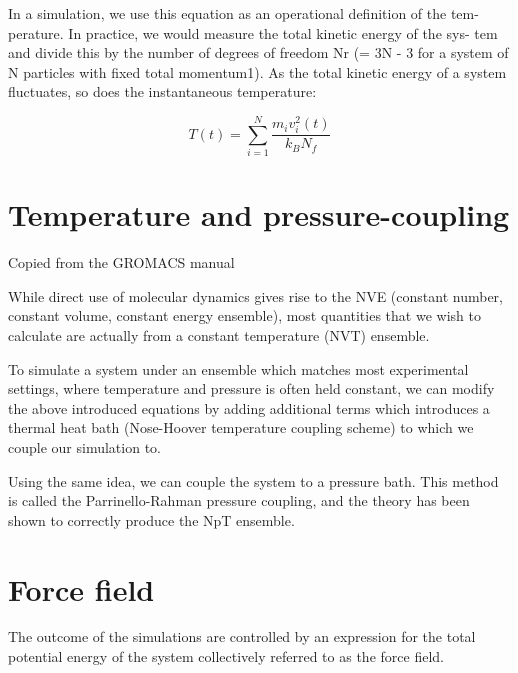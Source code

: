 In a simulation, we use this equation as an operational definition of the tem- perature. In practice, we would measure the total kinetic energy of the sys- tem and divide this by the number of degrees of freedom Nr (= 3N - 3 for a system of N particles with fixed total momentum1). As the total kinetic energy of a system fluctuates, so does the instantaneous temperature:

\begin{equation}
  T(t) = \sum_{i=1}^{N} \frac{m_iv_i^2(t)}{k_BN_f}
\end{equation}

\section{Temperature and pressure-coupling}
Copied from the GROMACS manual

While direct use of molecular dynamics gives rise to the NVE (constant number, constant volume, constant energy ensemble), most quantities that we wish to calculate are actually from a constant temperature (NVT) ensemble. 

To simulate a system under an ensemble which matches most experimental settings, where temperature and pressure is often held constant, we can modify the above introduced equations by adding additional terms which introduces a thermal heat bath (Nose-Hoover temperature coupling scheme) to which we couple our simulation to.

Using the same idea, we can couple the system to a pressure bath.  This method is called the Parrinello-Rahman pressure coupling, and the theory has been shown to correctly produce the NpT ensemble.

\section{Force field}
The outcome of the simulations are controlled by an expression for the total potential energy of the system collectively referred to as the force field.


